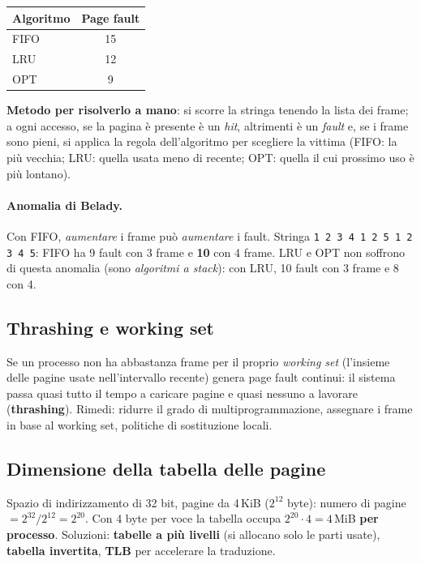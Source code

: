\begin{center}
\begin{tabular}{@{}lc@{}}
\toprule
\textbf{Algoritmo} & \textbf{Page fault} \\
\midrule
FIFO & 15 \\
LRU & 12 \\
OPT & 9 \\
\bottomrule
\end{tabular}
\end{center}
\textbf{Metodo per risolverlo a mano}: si scorre la stringa tenendo la lista dei frame; a ogni accesso, se la pagina è presente è un \emph{hit}, altrimenti è un \emph{fault} e, se i frame sono pieni, si applica la regola dell'algoritmo per scegliere la vittima (FIFO: la più vecchia; LRU: quella usata meno di recente; OPT: quella il cui prossimo uso è più lontano).

\paragraph{Anomalia di Belady.} Con FIFO, \emph{aumentare} i frame può \emph{aumentare} i fault. Stringa \texttt{1 2 3 4 1 2 5 1 2 3 4 5}: FIFO ha 9 fault con 3 frame e \textbf{10} con 4 frame. LRU e OPT non soffrono di questa anomalia (sono \emph{algoritmi a stack}): con LRU, 10 fault con 3 frame e 8 con 4.

\subsection{Thrashing e working set}
Se un processo non ha abbastanza frame per il proprio \emph{working set} (l'insieme delle pagine usate nell'intervallo recente) genera page fault continui: il sistema passa quasi tutto il tempo a caricare pagine e quasi nessuno a lavorare (\textbf{thrashing}). Rimedi: ridurre il grado di multiprogrammazione, assegnare i frame in base al working set, politiche di sostituzione locali.

\subsection{Dimensione della tabella delle pagine}
Spazio di indirizzamento di 32 bit, pagine da 4\,KiB ($2^{12}$ byte): numero di pagine $= 2^{32}/2^{12} = 2^{20}$. Con 4 byte per voce la tabella occupa $2^{20}\cdot 4 = 4$\,MiB \textbf{per processo}. Soluzioni: \textbf{tabelle a più livelli} (si allocano solo le parti usate), \textbf{tabella invertita}, \textbf{TLB} per accelerare la traduzione.

